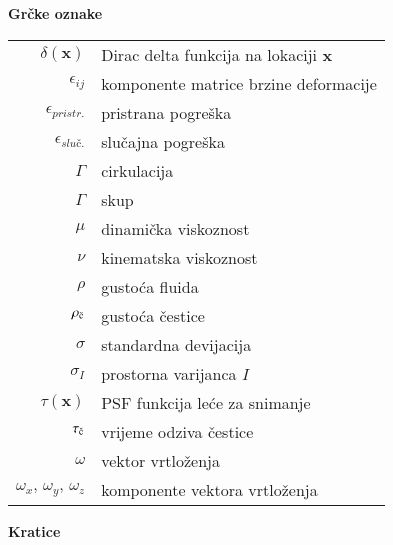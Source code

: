 \begin{flushleft}
\vskip 14mm
{\large\bf{Grčke oznake}}
\vskip 7mm

\begin{longtable}{rl}
		$\delta (\boldsymbol{x})$ & Dirac delta funkcija na lokaciji $\boldsymbol{x}$\\
		$\epsilon_{ij}$ & komponente matrice brzine deformacije\\
		$\epsilon_{pristr.}$ & pristrana pogreška\\
		$\epsilon_{slu\text{č}.}$ & slučajna pogreška\\
		$\Gamma$ & cirkulacija\\
		$\Gamma$ & skup\\
		$\mu$ & dinamička viskoznost\\
		$\nu$ & kinematska viskoznost\\
		$\rho$ & gustoća fluida\\
		$\rho_{\textup{č}}$ & gustoća čestice\\
		$\sigma$ & standardna devijacija\\
		$\sigma_{I}$ & prostorna varijanca $I$\\
		$\tau(\boldsymbol{x})$ & PSF funkcija leće za snimanje\\
		$\tau_{\textup{č}}$ & vrijeme odziva čestice\\
		$\omega$ & vektor vrtloženja\\
		$\omega_{x},\, \omega_{y},\, \omega_{z}$ & komponente vektora vrtloženja\\
\end{longtable}

\pagebreak
{\large\bf{Kratice}}
\vskip 7mm


\end{flushleft}
